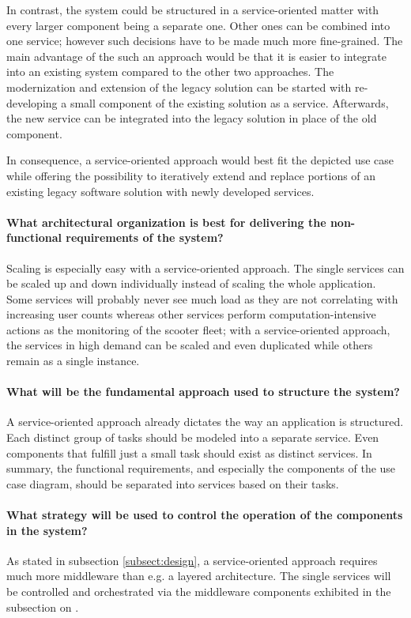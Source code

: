 \documentclass[12pt,a4paper]{report}
\begin{document}
In contrast, the system could be structured in a service-oriented matter with
every larger component being a separate one. Other ones can be combined into
one service; however such decisions have to be made much more fine-grained.
The main advantage of the such an approach would be that it is easier to
integrate into an existing system compared to the other two approaches.
The modernization and extension of the legacy solution can be started with
re-developing a small component of the existing solution as a service.
Afterwards, the new service can be integrated into the legacy solution
in place of the old component.

In consequence, a service-oriented approach would best fit the depicted use case
while offering the possibility to iteratively extend and replace portions of
an existing legacy software solution with newly developed services.

\paragraph{What architectural organization is best for delivering the non-functional requirements of the system?}
Scaling is especially easy with a service-oriented approach. The single services
can be scaled up and down individually instead of scaling the whole application.
Some services will probably never see much load as they are not correlating with
increasing user counts whereas other services perform computation-intensive
actions as the monitoring of the scooter fleet; with a service-oriented approach,
the services in high demand can be scaled and even duplicated while others
remain as a single instance.

\paragraph{What will be the fundamental approach used to structure the system?}
A service-oriented approach already dictates the way an application is structured.
Each distinct group of tasks should be modeled into a separate service.
Even components that fulfill just a small task should exist as distinct services.
In summary, the functional requirements, and especially the components of
the use case diagram, should be separated into services based on their tasks.

\paragraph{What strategy will be used to control the operation of the components in the system?}
As stated in subsection \ref{subsect:design}, a service-oriented approach
requires much more middleware than e.g. a layered architecture.
The single services will be controlled and orchestrated via the middleware components
exhibited in the subsection on \textit{}.
\end{document}
